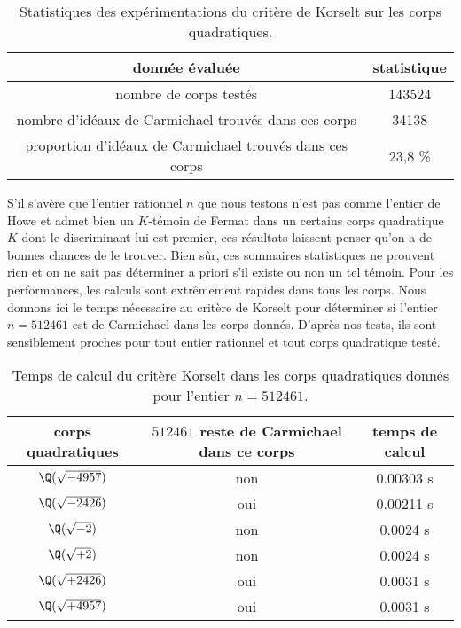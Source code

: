 \begin{table}[H]\label{statistiques-quadra}
	\begin{center}
		\begin{tabular}{|c|c|}
			\hline
			donnée évaluée & statistique \\
			\hline
			\hline
			nombre de corps testés & 143524 \\\hline
			nombre d'idéaux de Carmichael trouvés dans ces corps & 34138 \\\hline
			proportion d'idéaux de Carmichael trouvés dans ces corps & 23,8 \% \\\hline
		\end{tabular}
		\caption{Statistiques des expérimentations du critère de Korselt sur les corps quadratiques.}
	\end{center}
\end{table}

S'il s'avère que l'entier rationnel $n$ que nous testons n'est pas comme l'entier de Howe et admet bien un $K$-témoin de Fermat dans un certains corps quadratique $K$ dont le discriminant lui est premier, ces résultats laissent penser qu'on a de bonnes chances de le trouver. Bien sûr, ces sommaires statistiques ne prouvent rien et on ne sait pas déterminer a priori s'il existe ou non un tel témoin. Pour les performances, les calculs sont extrêmement rapides dans tous les corps. Nous donnons ici le temps nécessaire au critère de Korselt pour déterminer si l'entier $n = 512461$ est de Carmichael dans les corps donnés. D'après nos tests, ils sont sensiblement proches pour tout entier rationnel et tout corps quadratique testé.

\begin{table}[H]
	\begin{center}
		\begin{tabular}{|c|c|c|}
			\hline
			corps quadratiques & $512461$ reste de Carmichael dans ce corps & temps de calcul \\
			\hline
			\hline
			$\Q(\sqrt{-4957})$ & non & 0.00303 s \\\hline
			$\Q(\sqrt{-2426})$ & oui &0.00211 s \\\hline
			$\Q(\sqrt{-2})$ & non & 0.0024 s \\\hline
			$\Q(\sqrt{+2})$ & non & 0.0024 s \\\hline
			$\Q(\sqrt{+2426})$ & oui & 0.0031 s \\\hline
			$\Q(\sqrt{+4957})$ & oui & 0.0031 s \\\hline
		\end{tabular}
		\caption{Temps de calcul du critère Korselt dans les corps quadratiques donnés pour l'entier $n=512461$.}
	\end{center}
\end{table}
